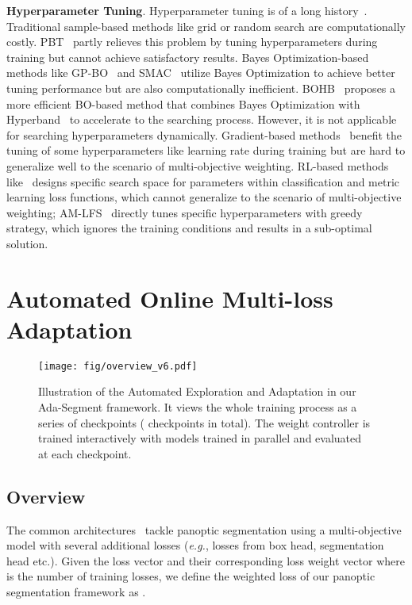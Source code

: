 \documentclass[letterpaper]{article} \usepackage{aaai21}  \usepackage{times}  \usepackage{helvet} \usepackage{courier}  \usepackage[hyphens]{url}  \usepackage{graphicx} \urlstyle{rm} \def\UrlFont{\rm}  \usepackage{natbib}  \usepackage{caption} \frenchspacing  \setlength{\pdfpagewidth}{8.5in}  \setlength{\pdfpageheight}{11in}
\begin{document}
 \noindent
 \textbf{Hyperparameter Tuning}. Hyperparameter tuning is of a long history~\cite{feurer2019HPOsuvey}. 
 Traditional sample-based methods like grid or random search are computationally costly. 
 PBT~\cite{jaderberg2017pbt} partly relieves this problem by tuning hyperparameters during training 
 but cannot achieve satisfactory results. 
 Bayes Optimization-based methods like GP-BO~\cite{snoek2012GPBO} and SMAC~\cite{hutter2011SMAC} 
 utilize Bayes Optimization to achieve better tuning performance but 
 are also computationally inefficient.
 BOHB~\cite{falkner2018bohb} proposes a more efficient BO-based method that combines Bayes Optimization
 with Hyperband~\cite{li2017hyperband} to accelerate to the searching process. 
 However, it is not applicable for searching hyperparameters dynamically. 
 Gradient-based methods~\cite{zeiler2012adadelta,baydin2017HDsgd,pedregosa2016AGhpo} benefit the tuning of some hyperparameters 
 like learning rate during training but are hard to generalize well to the scenario 
 of multi-objective weighting. 
RL-based methods like~\cite{huang2019addressing} designs specific search space for parameters within
 classification and metric learning loss functions, which cannot generalize to the scenario of 
 multi-objective weighting; AM-LFS~\cite{li2019AMlfs} directly tunes specific hyperparameters with greedy strategy, 
 which ignores the training conditions and results in a sub-optimal solution.

 \section{Automated Online Multi-loss Adaptation}
 \label{rec:Dm-ada}


 \begin{figure}[t]
   \centering
   \texttt{[image: fig/overview\_v6.pdf]}
\caption{
   Illustration of the Automated Exploration and Adaptation in our Ada-Segment framework. 
   It views the whole training process as a series of checkpoints (  checkpoints in total).
   The weight controller is trained interactively with 
    models trained in parallel and evaluated at each checkpoint. }
   \label{Overview}
\end{figure}

 \subsection{Overview}
 The common architectures~\cite{panopticFPNkirillov2019,upsnetxiong2019} tackle panoptic segmentation using 
 a multi-objective model with several additional losses 
 (\textit{e.g.}, losses from box head, segmentation head etc.).
 Given the loss vector  and their corresponding loss weight vector 
  where  is the number of training losses,
 we define the weighted loss of our panoptic segmentation framework as .
\end{document}
